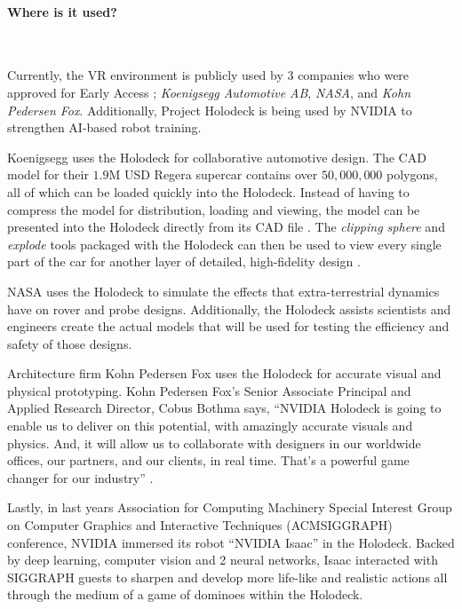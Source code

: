 \documentclass[11pt]{article}
\begin{document}
\paragraph{Where is it used?} ~ \par 
Currently, the VR environment is publicly used by 3 companies who were approved for Early Access \cite{nvidiamain}; \textit{Koenigsegg Automotive AB}, \textit{NASA}, and \textit{Kohn Pedersen Fox}. Additionally, Project Holodeck is being used by NVIDIA to strengthen AI-based robot training. \par
Koenigsegg uses the Holodeck for collaborative automotive design. The CAD model for their $1.9$M USD Regera supercar contains over $50,000,000$ polygons, all of which can be loaded quickly into the Holodeck. Instead of having to compress the model for distribution, loading and viewing, the model can be presented into the Holodeck directly from its CAD file \cite{nvidiamain}. The \textit{clipping sphere} and \textit{explode} tools packaged with the Holodeck can then be used to view every single part of the car for another layer of detailed, high-fidelity design \cite{nvidiablog3}.  \par
NASA uses the Holodeck to simulate the effects that extra-terrestrial dynamics have on rover and probe designs. Additionally, the Holodeck assists scientists and engineers create the actual models that will be used for testing the efficiency and safety of those designs. \cite{nvidiamain} \par
Architecture firm Kohn Pedersen Fox uses the Holodeck for accurate visual and physical prototyping.  Kohn Pedersen Fox's Senior Associate Principal and Applied Research Director, Cobus Bothma says, ``NVIDIA Holodeck is going to enable us to deliver on this potential, with amazingly accurate visuals and physics. And, it will allow us to collaborate with designers in our worldwide offices, our partners, and our clients, in real time. That’s a powerful game changer for our industry'' \cite{nvidiamain}. \par
Lastly, in last years Association for Computing Machinery Special Interest Group on Computer Graphics and Interactive Techniques (ACMSIGGRAPH) conference, NVIDIA immersed its robot ``NVIDIA Isaac'' in the Holodeck. Backed by deep learning, computer vision and 2 neural networks, Isaac interacted with SIGGRAPH guests to sharpen and develop more life-like and realistic actions \cite{nvidiablog3} all through the medium of a game of dominoes within the Holodeck. 
	
\end{document}
